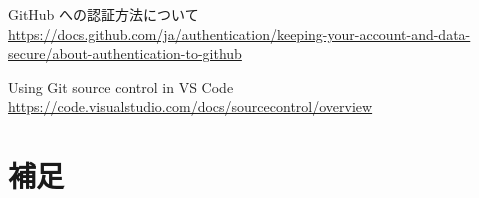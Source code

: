 \documentclass[aspectratio=169,dvipdfmx,cjk]{beamer}
\begin{document}
\begin{frame}{\insertsection}
\begin{thebibliography}{99}

   GitHub への認証方法について\\
  \href{https://docs.github.com/ja/authentication/keeping-your-account-and-data-secure/about-authentication-to-github
  }{https://docs.github.com/ja/authentication/keeping-your-account-and-data-secure/about-authentication-to-github}


   Using Git source control in VS Code\\
  \href{https://code.visualstudio.com/docs/sourcecontrol/overview
  }{https://code.visualstudio.com/docs/sourcecontrol/overview}

  \end{thebibliography}
\end{frame}

\section{補足}
\end{document}
